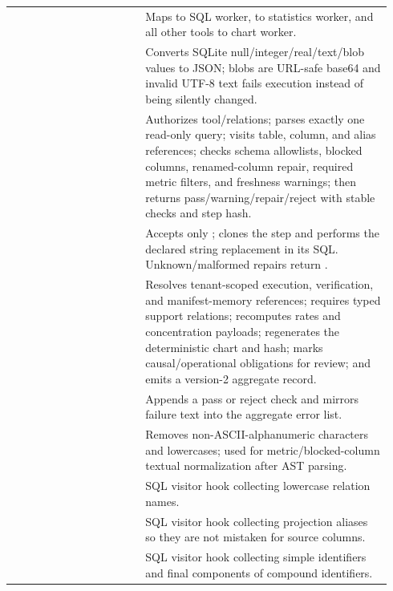 \begin{longtable}{L{0.33\linewidth}L{0.61\linewidth}}
 & Maps  to SQL worker,  to statistics worker, and all other tools to chart worker. \\
 & Converts SQLite null/integer/real/text/blob values to JSON; blobs are URL-safe base64 and invalid UTF-8 text fails execution instead of being silently changed. \\
 & Authorizes tool/relations; parses exactly one read-only query; visits table, column, and alias references; checks schema allowlists, blocked columns, renamed-column repair, required metric filters, and freshness warnings; then returns pass/warning/repair/reject with stable checks and step hash. \\
 & Accepts only ; clones the step and performs the declared string replacement in its SQL. Unknown/malformed repairs return . \\
 & Resolves tenant-scoped execution, verification, and manifest-memory references; requires typed support relations; recomputes rates and concentration payloads; regenerates the deterministic chart and hash; marks causal/operational obligations for review; and emits a version-2 aggregate record. \\
 & Appends a pass or reject check and mirrors failure text into the aggregate error list. \\
 & Removes non-ASCII-alphanumeric characters and lowercases; used for metric/blocked-column textual normalization after AST parsing. \\
 & SQL visitor hook collecting lowercase relation names. \\
 & SQL visitor hook collecting projection aliases so they are not mistaken for source columns. \\
 & SQL visitor hook collecting simple identifiers and final components of compound identifiers. \\
\bottomrule
\end{longtable}
